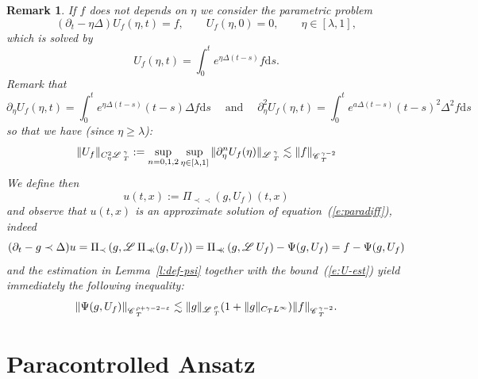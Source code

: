 \documentclass[11pt,reqno]{amsart}
\newcommand{\assign}{:=}
\newcommand{\mathd}{\mathrm{d}}
\newcommand{\precprec}{\prec\!\!\!\prec}
\newcommand{\tmop}[1]{\ensuremath{\operatorname{#1}}}
\newtheorem{remark}[theorem]{Remark}
\newcommand{\CC}{\mathscr{C} \hspace{.1em}}
\newcommand{\LL}{\mathscr{L} \hspace{.2em}}
\begin{document}
\begin{remark}
  If $f$ does not depends on $\eta$ we consider the parametric problem
  \begin{equation}
    (\partial_t - \eta \Delta) U_f (\eta, t) = f, \qquad U_f (\eta, 0) = 0,
    \qquad \eta \in [\lambda, 1], \label{e:def-U}
  \end{equation}
  which is solved by
  \[ U_f (\eta, t) = \int_0^t e^{\eta \Delta (t - s)} f \mathd s. \]
  Remark that
  \[ \partial_{\eta} U_f (\eta, t) = \int_0^t e^{\eta \Delta (t - s)} (t - s)
     \Delta f \mathd s \quad \tmop{and} \quad \partial_{\eta}^2 U_f (\eta, t)
     = \int_0^t e^{a \Delta (t - s)} (t - s)^2 \Delta^2 f \mathd s \]
  so that we have (since $\eta \geqslant \lambda$):
  \begin{equation}
    \| U_f \|_{C_{\eta}^2 \LL^{\gamma}_T} \assign \sup_{n = 0, 1, 2}
    \sup_{\eta \in [\lambda, 1]} \| \partial_{\eta}^n U_f (\eta)
    \|_{\LL_T^{\gamma}} \lesssim \| f \|_{\CC^{\gamma - 2}_T}  \label{e:U-est}
  \end{equation}
  We define then
  \begin{equation}
    u (t, x) \assign \Pi_{\precprec} (g, U_f) (t, x) \label{e:def-u}
  \end{equation}
  and observe that $u (t, x)$ is an approximate solution of
  equation~(\ref{e:paradiff}), indeed
  \[ (\partial_t - g \prec \Delta) u = \Pi_{\prec} \left( g, \LL
     \Pi_{\precprec} (g, U_f) \right) = \Pi_{\precprec} \left( g, \LL U_f
     \right) - \Psi (g, U_f) = f - \Psi (g, U_f) \]
  and the estimation in Lemma~\ref{l:def-psi} together with the
  bound~(\ref{e:U-est}) yield immediately the following inequality:
  \begin{equation}
    \| \Psi (g, U_f) \|_{\CC^{\rho + \gamma - 2 - \varepsilon}_T} \lesssim \|
    g \|_{\LL^{\rho}_T} (1 + \| g \|_{C_T L^{\infty}}) \| f \|_{\CC^{\gamma -
    2}_T} . \label{e:psi-est2}
  \end{equation}
\end{remark}

\section{Paracontrolled Ansatz\label{s:paracontrolled}}
\end{document}
